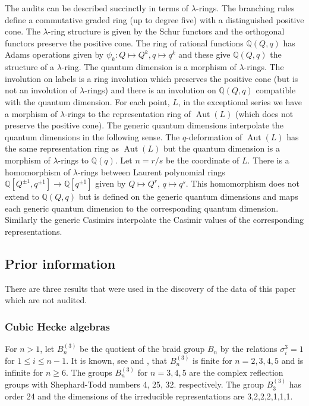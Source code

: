 \documentclass[12pt]{amsart}
\providecommand{\Aut}{\operatorname{Aut}}
\newcommand\bQ{\mathbb{Q}}
\begin{document}
The audits can be described succinctly in terms of $\lambda$-rings. The branching rules
define a commutative graded ring (up to degree five) with a distinguished positive cone.
The $\lambda$-ring structure is given by the Schur functors and the orthogonal functors
preserve the positive cone. The ring of rational functions $\bQ(Q,q)$ has Adams operations
given by $\psi_k\colon Q\mapsto Q^k, q\mapsto q^k$ and these give $\bQ(Q,q)$ the structure
of a $\lambda$-ring. The quantum dimension is a morphism of $\lambda$-rings. The involution
on labels is a ring involution which preserves the positive cone (but is not an involution
of $\lambda$-rings) and there is an involution on $\bQ(Q,q)$ compatible with the quantum dimension.
For each point, $L$, in the exceptional series we have 
a morphism of $\lambda$-rings to the representation ring of $\Aut(L)$ (which does not preserve
the positive cone). The generic quantum dimensions interpolate the quantum dimensions
in the following sense. The $q$-deformation of $\Aut(L)$ has the same representation ring
as $\Aut(L)$ but the quantum dimension is a morphism of $\lambda$-rings to $\bQ(q)$.
Let $n=r/s$ be the coordinate of $L$. There is a homomorphism of $\lambda$-rings between
Laurent polynomial rings $\bQ[Q^{\pm 1},q^{\pm 1}] \to \bQ[q^{\pm 1}]$ given by $Q\mapsto Q^r$, $q\mapsto q^s$. This homomorphism does not extend to $\bQ(Q,q)$ but is defined on the generic
quantum dimensions and maps each generic quantum dimension to the corresponding quantum dimension.
Similarly the generic Casimirs interpolate the Casimir values of the corresponding representations.

\subsection{Prior information}
There are three results that were used in the discovery of the data of this paper
which are not audited.
\subsubsection{Cubic Hecke algebras}\label{hecke}
For $n>1$, let $B_n^{(3)}$ be the quotient of the braid group
$B_n$ by the relations $\sigma_i^3=1$ for $1\leqslant i\leqslant n-1$.
It is known, see \cite{coxeter1957} and \cite{assion1978},
that $B_n^{(3)}$ is finite for $n=2,3,4,5$ and is infinite for $n\geqslant 6$. The groups
$B_n^{(3)}$ for $n=3,4,5$ are the complex reflection groups with Shephard-Todd numbers 4, 25, 32.
respectively. The group $B_3^{(3)}$ has order 24 and the dimensions of the irreducible representations are 3,2,2,2,1,1,1.
\end{document}
